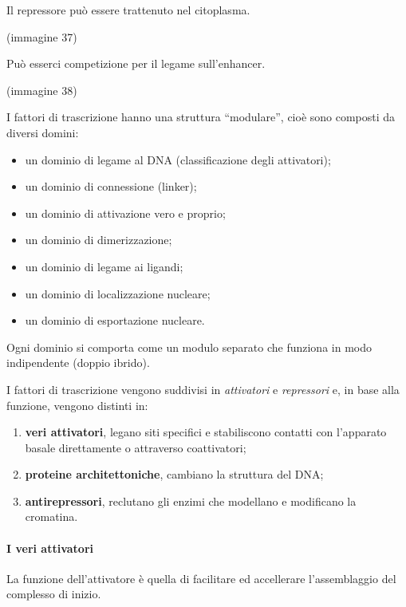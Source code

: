 \documentclass[]{article}
\begin{document}
Il repressore può essere trattenuto nel citoplasma.

(immagine 37)

Può esserci competizione per il legame sull'enhancer.

(immagine 38)

I fattori di trascrizione hanno una struttura ``modulare'', cioè sono
composti da diversi domini:

\begin{itemize}
\itemsep1pt\parskip0pt
\item
  un dominio di legame al DNA (classificazione degli attivatori);
\item
  un dominio di connessione (linker);
\item
  un dominio di attivazione vero e proprio;
\item
  un dominio di dimerizzazione;
\item
  un dominio di legame ai ligandi;
\item
  un dominio di localizzazione nucleare;
\item
  un dominio di esportazione nucleare.
\end{itemize}

Ogni dominio si comporta come un modulo separato che funziona in modo
indipendente (doppio ibrido).

I fattori di trascrizione vengono suddivisi in \emph{attivatori} e
\emph{repressori} e, in base alla funzione, vengono distinti in:

\begin{enumerate}
\def\labelenumi{\arabic{enumi}.}
\itemsep1pt\parskip0pt
\item
  \textbf{veri attivatori}, legano siti specifici e stabiliscono
  contatti con l'apparato basale direttamente o attraverso coattivatori;
\item
  \textbf{proteine architettoniche}, cambiano la struttura del DNA;
\item
  \textbf{antirepressori}, reclutano gli enzimi che modellano e
  modificano la cromatina.
\end{enumerate}

\paragraph{I veri attivatori}\label{i-veri-attivatori}

La funzione dell'attivatore è quella di facilitare ed accellerare
l'assemblaggio del complesso di inizio.
\end{document}

